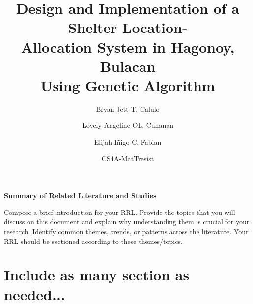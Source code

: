 \documentclass[english,12pt,letterpaper]{article}
\title{Design and Implementation of a Shelter Location- 
	\protect\\Allocation System in Hagonoy, Bulacan
	\protect\\ Using Genetic Algorithm}
\author{
	Bryan Jett T. Calulo \and
	Lovely Angeline OL. Cunanan \and
	Elijah Iñigo C. Fabian
}
\date{CS4A-MatTresist}
\begin{document}
	\maketitle
	
	{\centering\LARGE \textbf{Summary of Related Literature and Studies}\par}
	
	Compose a brief introduction for your RRL. Provide the topics that you will discuss on this document and explain why understanding them is crucial for your research. Identify common themes, trends, or patterns across the literature. Your RRL should be sectioned according to these themes/topics.  

	
	
	\section{Include as many section as needed...}
	
	\printbibliography
\end{document}
